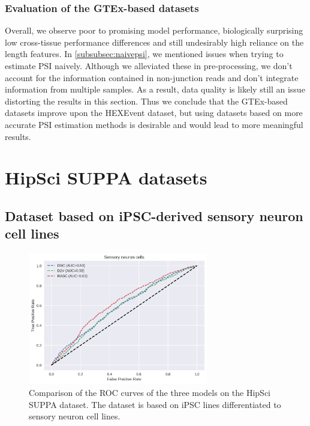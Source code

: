 \subsubsection{Evaluation of the GTEx-based datasets}
Overall, we observe poor to promising model performance, biologically surprising low cross-tissue performance differences and still undesirably high reliance on the length features. 
In \ref{subsubsec:naivepsi}, we mentioned issues when trying to estimate PSI naively. Although we alleviated these in pre-processing, we don't account for the information contained in non-junction reads and don't integrate information from multiple samples. As a result, data quality is likely still an issue distorting the results in this section. 
Thus we conclude that the GTEx-based datasets improve upon the HEXEvent dataset, but using datasets based on more accurate PSI estimation methods is desirable and would lead to more meaningful results. %





\section{HipSci SUPPA datasets} \label{subsec:hipsci_suppa}
\subsection{Dataset based on iPSC-derived sensory neuron cell lines}

\begin{figure}
	\centering\includegraphics[width=0.7\textwidth]{../visualizations/ch5-results/suppa_cross_model_roc_auc_comparison.png} 
	\caption{Comparison of the ROC curves of the three models on the HipSci SUPPA dataset. The dataset is based on iPSC lines differentiated to sensory neuron cell lines. }
	\label{fig:suppa_auc_roc}
\end{figure}
